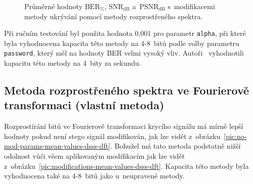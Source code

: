 \begin{figure}[H]
    \table
    \centering
    \caption{Průměrné hodnoty $\mathrm{BER}_{\%}$, $\mathrm{SNR}_\mathrm{dB}$
    a~$\mathrm{PSNR}_\mathrm{dB}$ s~modifikacemi metody ukrývání pomocí
    metody rozprostřeného spektra.}
    \label{pic:modifications-mean-values-dsss}
\end{figure}

Při ručním testování byl použita hodnota 0,001 pro parametr \texttt{alpha}, při
které byla vyhodnocena kapacita této metody na 4-8~bitů podle volby parametru
\texttt{password}, který měl na hodnoty BER velmi vysoký vliv.
Autoři~\cite{Bender1996} vyhodnotili kapacitu této metody na 4~bity za sekundu.

\subsection*{Metoda rozprostřeného spektra ve Fourierově transformaci (vlastní
metoda)}

Rozprostírání bitů ve Fourierově transformaci krycího signálu má mírně lepší
hodnoty pokud není stego signál modifikován, jak lze vidět
z~obrázku~\ref{pic:no-mod-params-mean-values-dsss-dft}. Bohužel má tato metoda
podstatně nižší odolnost vůči všem aplikovaným modifikacím jak lze vidět
z~obrázku~\ref{pic:modifications-mean-values-dsss-dft}. Kapacita této metody
byla vyhodnocena také na 4-8~bitů jako u~neupravené metody.

